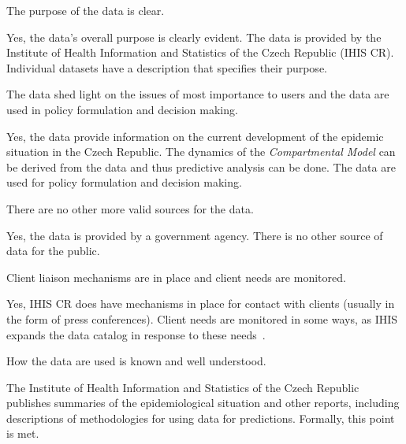 \begin{QandA}
    \item The purpose of the data is clear.
    \begin{answered}
        Yes, the data's overall purpose is clearly evident.
        The data is provided by the Institute of Health Information and Statistics of the Czech Republic (IHIS CR).
        Individual datasets have a description that specifies their purpose.
    \end{answered}

    \item The data shed light on the issues of most importance to users and the data are used in policy formulation and decision making.
    \begin{answered}
        Yes, the data provide information on the current development of the epidemic situation in the Czech Republic.
        The dynamics of the \textit{Compartmental Model} can be derived from the data and thus predictive analysis can be done.
        The data are used for policy formulation and decision making.
    \end{answered}

    \item There are no other more valid sources for the data.
    \begin{answered}
        Yes, the data is provided by a government agency.
        There is no other source of data for the public.
    \end{answered}

    \item Client liaison mechanisms are in place and client needs are monitored.
    \begin{answered}
        Yes, IHIS CR does have mechanisms in place for contact with clients (usually in the form of press conferences).
        Client needs are monitored in some ways, as IHIS expands the data catalog in response to these needs~\cite{uzis-ockovani}.
    \end{answered}

    \item How the data are used is known and well understood.
    \begin{answered}
        The Institute of Health Information and Statistics of the Czech Republic publishes summaries of the epidemiological situation and other reports, including descriptions of methodologies for using data for predictions.
        Formally, this point is met.
    \end{answered}


\end{QandA}
